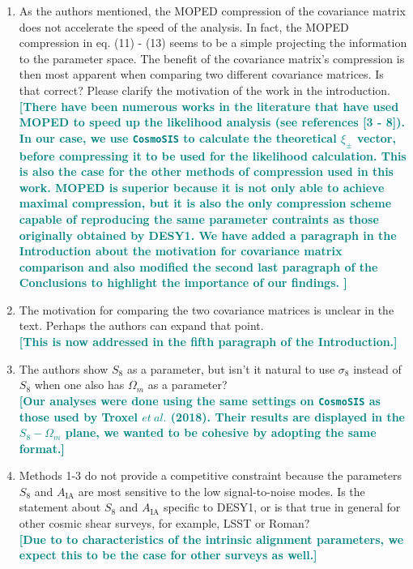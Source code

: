 \documentclass{article}
\newcommand\reply[1]{{\bf {\textcolor{teal}{[#1]}}}}
\begin{document}
	\begin{enumerate}
	\item As the authors mentioned, the MOPED compression of the covariance matrix does not accelerate the speed of the analysis. In fact, the MOPED compression in eq. (11) - (13) seems to be a simple projecting the information to the parameter space. The benefit of the covariance matrix's compression is then most apparent when comparing two different covariance matrices. Is that correct? Please clarify the motivation of the work in the introduction. \\
	\reply{There have been numerous works in the literature that have used MOPED to speed up the likelihood analysis (see references [3 - 8]). In our case, we use \texttt{CosmoSIS} to calculate the theoretical $\xi_{\pm}$ vector, before compressing it to be used for the likelihood calculation. This is also the case for the other methods of compression used in this work. MOPED is superior because it is not only able to achieve maximal compression, but it is also the only compression scheme capable of reproducing the same parameter contraints as those originally obtained by DESY1. We have added a paragraph in the Introduction about the motivation for covariance matrix comparison and also modified the second last paragraph of the Conclusions to highlight the importance of our findings. }
	
	\item The motivation for comparing the two covariance matrices is unclear in the text. Perhaps the authors can expand that point. \\	
	\reply{This is now addressed in the fifth paragraph of  the Introduction.}
	
	\item The authors show $S_8$ as a parameter, but isn't it natural to use $\sigma_8$ instead of $S_8$ when one also has $\Omega_m$ as a parameter? \\
	\reply{Our analyses were done using the same settings on \texttt{CosmoSIS} as those used by Troxel $et\ al.$ (2018). Their results are displayed in the $S_8 - \Omega_m$ plane, we wanted to be cohesive by adopting the same format.}
	
	\item Methods 1-3 do not provide a competitive constraint because the parameters $S_8$ and $A_{\text{IA}}$ are most sensitive to the low signal-to-noise modes. Is the statement about $S_8$ and $A_{\text{IA}}$ specific to DESY1, or is that true in general for other cosmic shear surveys, for example, LSST or Roman? \\	
		\reply{Due to to characteristics of the intrinsic alignment parameters, we expect this to be the case for other surveys as well.}
	\end{enumerate}
	
\end{document}
